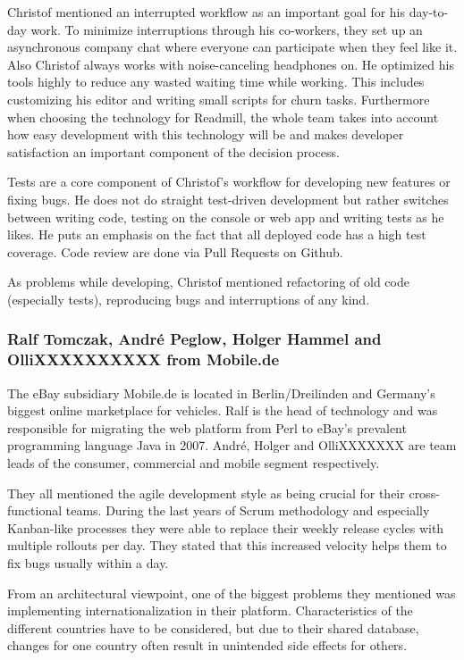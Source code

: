 Christof mentioned an interrupted workflow as an important goal for his day-to-day work. To minimize interruptions through his co-workers, they set up an asynchronous company chat where everyone can participate when they feel like it. Also Christof always works with noise-canceling headphones on. He optimized his tools highly to reduce any wasted waiting time while working. This includes customizing his editor and writing small scripts for churn tasks. Furthermore when choosing the technology for Readmill, the whole team takes into account how easy development with this technology will be and makes developer satisfaction an important component of the decision process.

Tests are a core component of Christof's workflow for developing new features or fixing bugs. He does not do straight test-driven development but rather switches between writing code, testing on the console or web app and writing tests as he likes. He puts an emphasis on the fact that all deployed code has a high test coverage. Code review are done via Pull Requests on Github.

As problems while developing, Christof mentioned refactoring of old code (especially tests), reproducing bugs and interruptions of any kind.

\subsubsection{Ralf Tomczak, Andr\'e Peglow, Holger Hammel and OlliXXXXXXXXXX from Mobile.de}
The eBay subsidiary Mobile.de is located in Berlin/Dreilinden and Germany's biggest online marketplace for vehicles. Ralf is the head of technology and was responsible for migrating the web platform from Perl to eBay's prevalent programming language Java in 2007. Andr\'e, Holger and OlliXXXXXXX  are team leads of the consumer, commercial and mobile segment respectively.

They all mentioned the agile development style as being crucial for their cross-functional teams. During the last years of Scrum methodology and especially Kanban-like processes they were able to replace their weekly release cycles with multiple rollouts per day. They stated that this increased velocity helps them to fix bugs usually within a day.

From an architectural viewpoint, one of the biggest problems they mentioned was implementing internationalization in their platform. Characteristics of the different countries have to be considered, but due to their shared database, changes for one country often result in unintended side effects for others.

